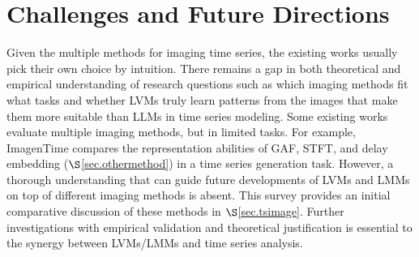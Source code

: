\section{Challenges and Future Directions}\label{sec.future}



 Given the multiple methods for imaging time series, the existing works usually pick their own choice by intuition. %
There remains a gap in both theoretical and empirical understanding of research questions such as which imaging methods fit what tasks and whether LVMs truly learn patterns from the images that make them more suitable than LLMs in time series modeling. %
Some existing works evaluate multiple imaging methods, but in limited tasks. For example, %
ImagenTime \cite{naiman2024utilizing} compares the representation abilities of GAF, STFT, and delay embedding ($\S$\ref{sec.othermethod}) in a time series generation task. However, a %
thorough understanding that can guide future developments of LVMs and LMMs on top of different imaging methods is absent. This survey provides an initial comparative discussion of these methods in $\S$\ref{sec.tsimage}. Further investigations with empirical validation and theoretical justification is essential to the synergy between LVMs/LMMs and time series analysis.





